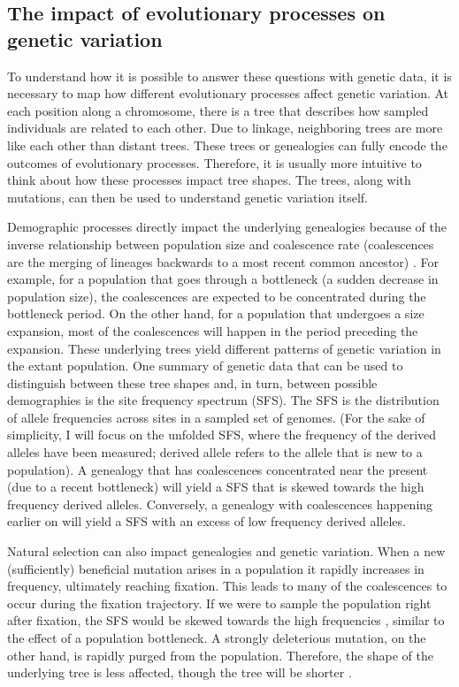 \subsection{The impact of evolutionary processes on genetic variation}

To understand how it is possible to answer these questions with genetic data,
it is necessary to map how different evolutionary processes affect genetic variation.
At each position along a chromosome, there is a tree that describes how sampled individuals are related to each other.
Due to linkage, neighboring trees are more like each other than distant trees.
These trees or genealogies can fully encode the outcomes of evolutionary processes.
Therefore, it is usually more intuitive to think about how these processes impact tree shapes.
The trees, along with mutations, can then be used to understand genetic variation itself.

Demographic processes directly impact the underlying genealogies because of the inverse relationship between population size and coalescence rate (coalescences are the merging of lineages backwards to a most recent common ancestor) \citep{wakely_coalescent_2016}.
For example, for a population that goes through a bottleneck (\ie a sudden decrease in population size),
the coalescences are expected to be concentrated during the bottleneck period.
On the other hand, for a population that undergoes a size expansion,
most of the coalescences will happen in the period preceding the expansion.
These underlying trees yield different patterns of genetic variation in the extant population.
One summary of genetic data that can be used to distinguish between these tree shapes and,
in turn, between possible demographies is the site frequency spectrum (SFS).
The SFS is the distribution of allele frequencies across sites in a sampled set of genomes.
(For the sake of simplicity, I will focus on the unfolded SFS, where the frequency of the derived alleles have been measured; derived allele refers to the allele that is new to a population).
A genealogy that has coalescences concentrated near the present (due to a recent bottleneck) will yield a SFS that is skewed towards the high frequency derived alleles.
Conversely, a genealogy with coalescences happening earlier on will yield a SFS with an excess of low frequency derived alleles.

Natural selection can also impact genealogies and genetic variation.
When a new (sufficiently) beneficial mutation arises in a population it rapidly increases in frequency, ultimately reaching fixation.
This leads to many of the coalescences to occur during the fixation trajectory.
If we were to sample the population right after fixation,
the SFS would be skewed towards the high frequencies \citep{kim_allele_2006}, similar to the effect of a population bottleneck.
A strongly deleterious mutation, on the other hand, is rapidly purged from the population.
Therefore, the shape of the underlying tree is less affected, though the tree will be shorter \citep{williamson_genealogy_2002, barton_effect_2004}.

